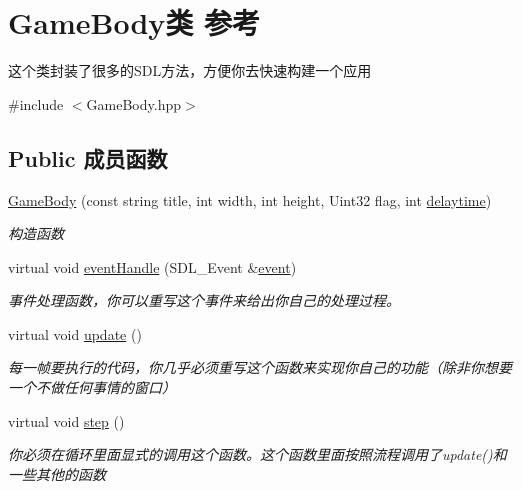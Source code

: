 \hypertarget{class_game_body}{}\section{Game\+Body类 参考}
\label{class_game_body}


这个类封装了很多的\+S\+D\+L方法，方便你去快速构建一个应用  




{\ttfamily \#include $<$Game\+Body.\+hpp$>$}

\subsection*{Public 成员函数}
\begin{DoxyCompactItemize}
\item 
\mbox{\hyperlink{class_game_body_ad93266a1461592dbc9e9f452adff1304}{Game\+Body}} (const string title, int width, int height, Uint32 flag, int \mbox{\hyperlink{class_game_body_a7a92a21e03a1032a60fa925d21d4a54a}{delaytime}})
\begin{DoxyCompactList}\small\item\em 构造函数 \end{DoxyCompactList}\item 
virtual void \mbox{\hyperlink{class_game_body_a62e1c8511e6bf91ea4ed7a46ebc50e8d}{event\+Handle}} (S\+D\+L\+\_\+\+Event \&\mbox{\hyperlink{class_game_body_a7a7f0234ae77e1aae482522badaca124}{event}})
\begin{DoxyCompactList}\small\item\em 事件处理函数，你可以重写这个事件来给出你自己的处理过程。 \end{DoxyCompactList}\item 
virtual void \mbox{\hyperlink{class_game_body_abeff43d0ab34cf69977c386736953552}{update}} ()
\begin{DoxyCompactList}\small\item\em 每一帧要执行的代码，你几乎必须重写这个函数来实现你自己的功能（除非你想要一个不做任何事情的窗口） \end{DoxyCompactList}\item 
virtual void \mbox{\hyperlink{class_game_body_a4eca53ae69ac545e3e3666d7929a9cf4}{step}} ()
\begin{DoxyCompactList}\small\item\em 你必须在循环里面显式的调用这个函数。这个函数里面按照流程调用了update()和一些其他的函数 \end{DoxyCompactList}\item 

\end{DoxyCompactItemize}
